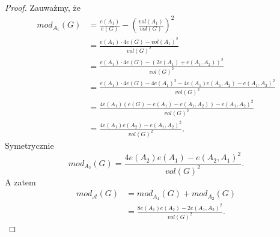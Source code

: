 \documentclass[letterpaper,12pt]{article}
\begin{document}
\begin{proof}
  Zauważmy, że
  \begin{align*}
    mod_{A_1}(G) & = \frac{e(A_1)}{e(G)} - \left(\frac{vol(A_1)}{vol(G)}\right)^2                    \\
                 & = \frac{e(A_1)\cdot 4e(G) - vol(A_1)^2}{vol(G)^2}                                 \\
                 & = \frac{e(A_1)\cdot 4e(G) - (2e(A_1)+e(A_1, A_2))^2}{vol(G)^2}                    \\
                 & = \frac{e(A_1)\cdot 4e(G) - 4e(A_1)^2-4e(A_1)e(A_1, A_2)-e(A_1, A_2)^2}{vol(G)^2} \\
                 & = \frac{4e(A_1)(e(G)-e(A_1)-e(A_1, A_2))-e(A_1, A_2)^2}{vol(G)^2}                 \\
                 & = \frac{4e(A_1)e(A_2)-e(A_1, A_2)^2}{vol(G)^2}.
  \end{align*}
  Symetrycznie
  \[mod_{A_2}(G) = \frac{4e(A_2)e(A_1)-e(A_2, A_1)^2}{vol(G)^2}.\]
  A zatem
  \begin{align*}
    mod_{\mathcal{A}}(G) & = mod_{A_1}(G) + mod_{A_2}(G)                     \\
                         & = \frac{8e(A_1)e(A_2) - 2e(A_1,A_2)^2}{vol(G)^2}.
  \end{align*}
\end{proof}
\end{document}

